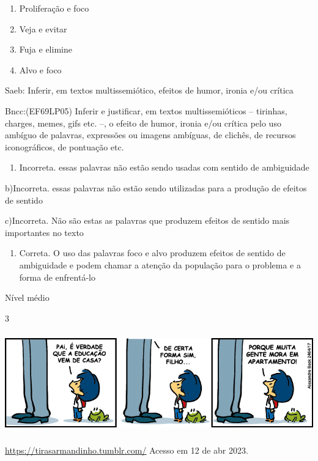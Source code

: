 {\begin{enumerate}
\def\labelenumi{\alph{enumi})}
\item
  Proliferação e foco
\item
  Veja e evitar
\item
  Fuja e elimine
\item
  Alvo e foco
\end{enumerate}

Saeb: Inferir, em textos multissemiótico, efeitos de humor, ironia e/ou
crítica

Bncc:(EF69LP05) Inferir e justificar, em textos multissemióticos --
tirinhas, charges, memes, gifs etc. --, o efeito de humor, ironia e/ou
crítica pelo uso ambíguo de palavras, expressões ou imagens ambíguas, de
clichês, de recursos iconográficos, de pontuação etc.

\begin{enumerate}
\def\labelenumi{\arabic{enumi}.}
\tightlist
\item
  Incorreta. essas palavras não estão sendo usadas com sentido de
  ambiguidade
\end{enumerate}

b)Incorreta. essas palavras não estão sendo utilizadas para a produção
de efeitos de sentido

c)Incorreta. Não são estas as palavras que produzem efeitos de sentido
mais importantes no texto

\begin{enumerate}
\def\labelenumi{\arabic{enumi}.}
\tightlist
\item
  Correta. O uso das palavras foco e alvo produzem efeitos de sentido de
  ambiguidade e podem chamar a atenção da população para o problema e a
  forma de enfrentá-lo
\end{enumerate}

Nível médio

\num{3}

\includegraphics[width=5.90551in,height=1.70833in]{./imgSAEB_7_POR/media/image7.png}

\href{https://tirasarmandinho.tumblr.com/}{\uline{https://tirasarmandinho.tumblr.com/}}
Acesso em 12 de abr 2023.

}
